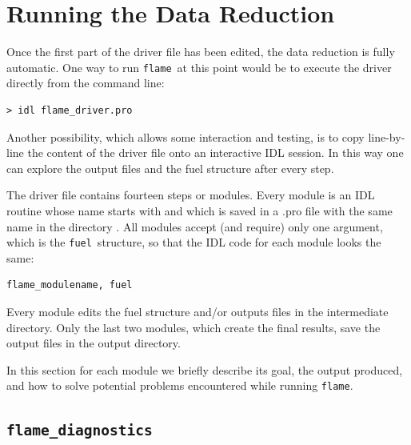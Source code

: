 \documentclass[a4paper]{article}
\newcommand{\flame}{\texttt{flame}}
\newcommand{\fuel}{\texttt{fuel}}
\begin{document}



\section{Running the Data Reduction}
\label{sec:data_reduction}

Once the first part of the driver file has been edited, the data reduction is fully automatic. One way to run \flame\ at this point would be to execute the driver directly from the command line:
\begin{lstlisting}
> idl flame_driver.pro
\end{lstlisting}
Another possibility, which allows some interaction and testing, is to copy line-by-line the content of the driver file onto an interactive IDL session. In this way one can explore the output files and the fuel structure after every step.

The driver file contains fourteen steps or modules. Every module is an IDL routine whose name starts with  and which is saved in a .pro file with the same name in the directory . All modules accept (and require) only one argument, which is the \fuel\ structure, so that the IDL code for each module looks the same:
\begin{lstlisting}
flame_modulename, fuel
\end{lstlisting}

Every module edits the fuel structure and/or outputs files in the intermediate directory. Only the last two modules, which create the final results, save the output files in the output directory.

In this section for each module we briefly describe its goal, the output produced, and how to solve potential problems encountered while running \flame.



\subsection{\texttt{flame\_diagnostics}}
\label{sec:diagnostics}
\end{document}
